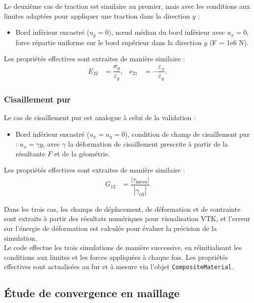 \documentclass[a4paper,11pt]{article}
\begin{document}
Le deuxième cas de traction est similaire au premier, mais avec les conditions aux limites adaptées pour appliquer une traction dans la direction $y$ :
\begin{itemize}
    \item Bord inférieur encastré ($u_y = 0$), nœud médian du bord inférieur avec $u_x = 0$, force répartie uniforme sur le bord supérieur dans la direction $y$ (F = 1e6 N).
\end{itemize}

Les propriétés effectives sont extraites de manière similaire :
\begin{align}
    E_{22} &= \dfrac{\sigma_y}{\varepsilon_y},
    & \nu_{21} &= -\dfrac{\varepsilon_x}{\varepsilon_y}.
\end{align}
\subsubsection*{Cisaillement pur}    

Le cas de cisaillement pur est analogue à celui de la validation :
\begin{itemize}
    \item Bord inférieur encastré ($u_x = u_y = 0$), condition de champ de cisaillement pur : $u_x = \gamma y$, avec $\gamma$ la déformation de cisaillement prescrite à partir de la résultante $F$ et de la géométrie.
\end{itemize}

Les propriétés effectives sont extraites de manière similaire :
\begin{align}
    G_{12} &= \dfrac{|\tau_{\mathrm{mean}}|}{|\gamma_{\mathrm{eff}}|}
\end{align}

Dans les trois cas, les champs de déplacement, de déformation et de contrainte sont extraits à partir des résultats numériques pour visualisation VTK, et l'erreur sur l'énergie de déformation est calculée pour évaluer la précision de la simulation. \\ 

Le code effectue les trois simulations de manière successive, en réinitialisant les conditions aux limites et les forces appliquées à chaque fois. Les propriétés effectives sont actualisées au fur et à mesure via l'objet \texttt{CompositeMaterial}. 

\subsection{Étude de convergence en maillage}
\end{document}
